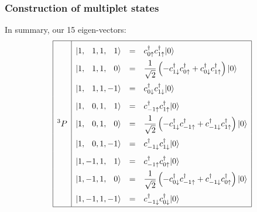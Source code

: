 
\begin{frame}[t]
  \frametitle{Construction of multiplet states}
  \scriptsize
  In summary, our 15 eigen-vectors:
  \begin{equation*}
  \renewcommand\arraystretch{1.8}
  \begin{array}{|>{\displaystyle}c|>{\displaystyle}c >{\displaystyle}c >{\displaystyle}l|}
  \hline
  & |1,\phantom{-}1,1,\phantom{-}1\rangle & = & c_{0\uparrow}^\dagger c_{1\uparrow}^\dagger |0\rangle \\ 
  & |1,\phantom{-}1,1,\phantom{-}0\rangle & = & \frac{1}{\sqrt{2}} \left( -c_{1\downarrow}^\dagger c_{0\uparrow}^\dagger +c_{0\downarrow}^\dagger c_{1\uparrow}^\dagger \right)|0\rangle \\ 
  & |1,\phantom{-}1,1,-1\rangle & = & c_{0\downarrow}^\dagger c_{1\downarrow}^\dagger |0\rangle \\ 
  & |1,\phantom{-}0,1,\phantom{-}1\rangle & = & c_{-1\uparrow}^\dagger c_{1\uparrow}^\dagger |0\rangle \\ 
  ^{3}P & |1,\phantom{-}0,1,\phantom{-}0\rangle & = & \frac{1}{\sqrt{2}} \left( -c_{1\downarrow}^\dagger c_{-1\uparrow}^\dagger +c_{-1\downarrow}^\dagger c_{1\uparrow}^\dagger \right)|0\rangle \\ 
  & |1,\phantom{-}0,1,-1\rangle & = & c_{-1\downarrow}^\dagger c_{1\downarrow}^\dagger |0\rangle \\ 
  & |1,-1,1,\phantom{-}1\rangle & = & c_{-1\uparrow}^\dagger c_{0\uparrow}^\dagger |0\rangle \\ 
  & |1,-1,1,\phantom{-}0\rangle & = & \frac{1}{\sqrt{2}} \left( -c_{0\downarrow}^\dagger c_{-1\uparrow}^\dagger +c_{-1\downarrow}^\dagger c_{0\uparrow}^\dagger \right)|0\rangle \\ 
  & |1,-1,1,-1\rangle & = & c_{-1\downarrow}^\dagger c_{0\downarrow}^\dagger |0\rangle \\
  \hline
  \end{array}
  \end{equation*}
\end{frame}

